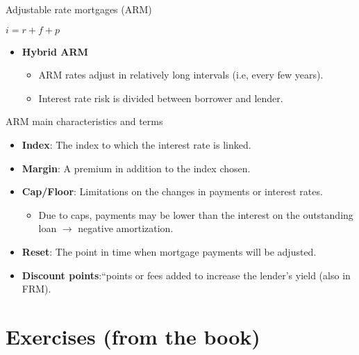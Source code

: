 \documentclass[ignorenonframetext,]{beamer}
\providecommand{\tightlist}{%
\setlength{\itemsep}{0pt}\setlength{\parskip}{0pt}}
\begin{document}
\begin{frame}{Adjustable rate mortgages (ARM)}

\(i = r + f + p\)

\begin{itemize}
\tightlist
\item
  \textbf{Hybrid ARM}

  \begin{itemize}
  \tightlist
  \item
    ARM rates adjust in relatively long intervals (i.e, every few
    years).
  \item
    Interest rate risk is divided between borrower and lender.
  \end{itemize}
\end{itemize}

\end{frame}

\begin{frame}{ARM main characteristics and terms}

\begin{itemize}
\tightlist
\item
  \textbf{Index}: The index to which the interest rate is linked.
\item
  \textbf{Margin}: A premium in addition to the index chosen.
\item
  \textbf{Cap/Floor}: Limitations on the changes in payments or interest
  rates.

  \begin{itemize}
  \tightlist
  \item
    Due to caps, payments may be lower than the interest on the
    outstanding loan \(\rightarrow\) negative amortization.
  \end{itemize}
\item
  \textbf{Reset}: The point in time when mortgage payments will be
  adjusted.
\item
  \textbf{Discount points}:``points or fees added to increase the
  lender's yield (also in FRM).
\end{itemize}

\end{frame}

\section{Exercises (from the book)}\label{exercises-from-the-book}
\end{document}
